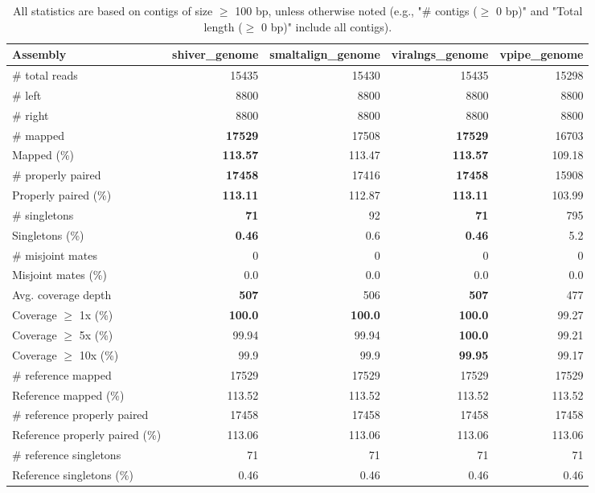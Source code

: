 \documentclass[12pt,a4paper]{article}
\begin{document}
\begin{table}[ht]
\begin{center}
\caption{All statistics are based on contigs of size $\geq$ 100 bp, unless otherwise noted (e.g., "\# contigs ($\geq$ 0 bp)" and "Total length ($\geq$ 0 bp)" include all contigs).}
\begin{tabular}{|l*{4}{|r}|}
\hline
Assembly & shiver\_genome & smaltalign\_genome & viralngs\_genome & vpipe\_genome \\ \hline
\# total reads & 15435 & 15430 & 15435 & 15298 \\ \hline
\# left & 8800 & 8800 & 8800 & 8800 \\ \hline
\# right & 8800 & 8800 & 8800 & 8800 \\ \hline
\# mapped & {\bf 17529} & 17508 & {\bf 17529} & 16703 \\ \hline
Mapped (\%) & {\bf 113.57} & 113.47 & {\bf 113.57} & 109.18 \\ \hline
\# properly paired & {\bf 17458} & 17416 & {\bf 17458} & 15908 \\ \hline
Properly paired (\%) & {\bf 113.11} & 112.87 & {\bf 113.11} & 103.99 \\ \hline
\# singletons & {\bf 71} & 92 & {\bf 71} & 795 \\ \hline
Singletons (\%) & {\bf 0.46} & 0.6 & {\bf 0.46} & 5.2 \\ \hline
\# misjoint mates & 0 & 0 & 0 & 0 \\ \hline
Misjoint mates (\%) & 0.0 & 0.0 & 0.0 & 0.0 \\ \hline
Avg. coverage depth & {\bf 507} & 506 & {\bf 507} & 477 \\ \hline
Coverage $\geq$ 1x (\%) & {\bf 100.0} & {\bf 100.0} & {\bf 100.0} & 99.27 \\ \hline
Coverage $\geq$ 5x (\%) & 99.94 & 99.94 & {\bf 100.0} & 99.21 \\ \hline
Coverage $\geq$ 10x (\%) & 99.9 & 99.9 & {\bf 99.95} & 99.17 \\ \hline
\# reference mapped & 17529 & 17529 & 17529 & 17529 \\ \hline
Reference mapped (\%) & 113.52 & 113.52 & 113.52 & 113.52 \\ \hline
\# reference properly paired & 17458 & 17458 & 17458 & 17458 \\ \hline
Reference properly paired (\%) & 113.06 & 113.06 & 113.06 & 113.06 \\ \hline
\# reference singletons & 71 & 71 & 71 & 71 \\ \hline
Reference singletons (\%) & 0.46 & 0.46 & 0.46 & 0.46 \\ \hline

\end{tabular}
\end{center}
\end{table}
\end{document}
